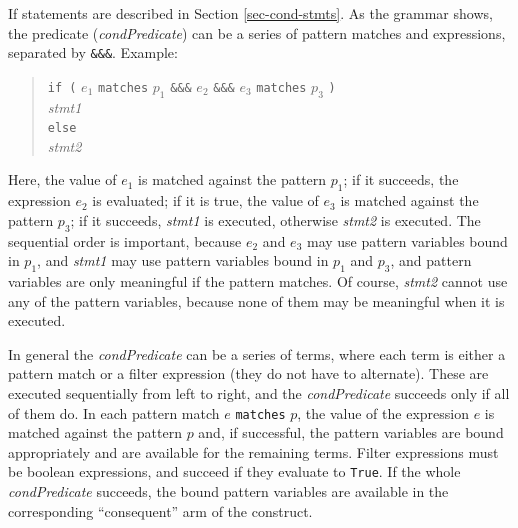 \documentclass[twoside,letterpaper]{article}
\newcommand{\hm}{\hspace*{1em}}
\newcommand{\nterm}[1]{\emph{#1}}
\newcommand{\term}[1]{\texttt{#1}}
\begin{document}
If statements are described in Section \ref{sec-cond-stmts}.  As the
grammar shows, the predicate (\nterm{condPredicate}) can be a series
of pattern matches and expressions, separated by \texttt{\&\&\&}.
Example:
\begin{quote}
\term{if (} $e_1$ \texttt{matches} $p_1$ \hm \texttt{\&\&\&} \hm $e_2$ \hm
\texttt{\&\&\&} \hm $e_3$ \texttt{matches} $p_3$ \texttt{)} \\
\hm \emph{stmt1} \\
\texttt{else}   \\
\hm \emph{stmt2}
\end{quote}
Here, the value of $e_1$ is matched against the pattern $p_1$; if it
succeeds, the expression $e_2$ is evaluated; if it is true, the value
of $e_3$ is matched against the pattern $p_3$; if it succeeds,
\emph{stmt1} is executed, otherwise \emph{stmt2} is executed.  The
sequential order is important, because $e_2$ and $e_3$ may use pattern
variables bound in $p_1$, and \emph{stmt1} may use pattern variables
bound in $p_1$ and $p_3$, and pattern variables are only meaningful if
the pattern matches.  Of course, \emph{stmt2} cannot use any of the
pattern variables, because none of them may be meaningful when it is
executed.

In general the \nterm{condPredicate} can be a series of terms, where
each term is either a pattern match or a filter expression (they do
not have to alternate).  These are executed sequentially from left to
right, and the \nterm{condPredicate} succeeds only if all of them
do. In each pattern match $e$ \term{matches} $p$, the value of the
expression $e$ is matched against the pattern $p$ and, if successful,
the pattern variables are bound appropriately and are available for
the remaining terms.  Filter expressions must be boolean expressions,
and succeed if they evaluate to \texttt{True}.  If the whole
\nterm{condPredicate} succeeds, the bound pattern variables are
available in the corresponding ``consequent'' arm of the construct.
\end{document}
